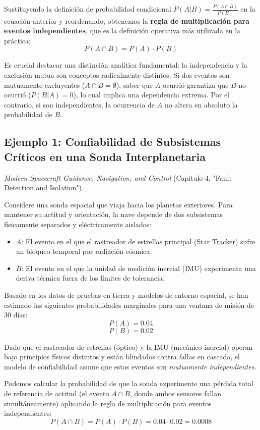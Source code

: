 Sustituyendo la definición de probabilidad condicional $P(A|B) = \frac{P(A \cap B)}{P(B)}$ en la ecuación anterior y reordenando, obtenemos la \textbf{regla de multiplicación para eventos independientes}, que es la definición operativa más utilizada en la práctica:
$$ P(A \cap B) = P(A) \cdot P(B) $$

Es crucial destacar una distinción analítica fundamental: la independencia y la exclusión mutua son conceptos radicalmente distintos. Si dos eventos son mutuamente excluyentes ($A \cap B = \emptyset$), saber que $A$ ocurrió garantiza que $B$ no ocurrió ($P(B|A) = 0$), lo cual implica una dependencia extrema. Por el contrario, si son independientes, la ocurrencia de $A$ no altera en absoluto la probabilidad de $B$.

\subsection{Ejemplo 1: Confiabilidad de Subsistemas Críticos en una Sonda Interplanetaria}

 \textit{Modern Spacecraft Guidance, Navigation, and Control} (Capítulo 4, "Fault Detection and Isolation"). 

Considere una sonda espacial que viaja hacia los planetas exteriores. Para mantener su actitud y orientación, la nave depende de dos subsistemas físicamente separados y eléctricamente aislados:
\begin{itemize}
    \item $A$: El evento en el que el rastreador de estrellas principal (Star Tracker) sufre un bloqueo temporal por radiación cósmica.
    \item $B$: El evento en el que la unidad de medición inercial (IMU) experimenta una deriva térmica fuera de los límites de tolerancia.
\end{itemize}

Basado en los datos de pruebas en tierra y modelos de entorno espacial, se han estimado las siguientes probabilidades marginales para una ventana de misión de 30 días:
$$ P(A) = 0.04 $$
$$ P(B) = 0.02 $$

Dado que el rastreador de estrellas (óptico) y la IMU (mecánico-inercial) operan bajo principios físicos distintos y están blindados contra fallas en cascada, el modelo de confiabilidad asume que estos eventos son \textit{mutuamente independientes}. 

Podemos calcular la probabilidad de que la sonda experimente una pérdida total de referencia de actitud (el evento $A \cap B$, donde ambos sensores fallan simultáneamente) aplicando la regla de multiplicación para eventos independientes:
$$ P(A \cap B) = P(A) \cdot P(B) = 0.04 \cdot 0.02 = 0.0008 $$

